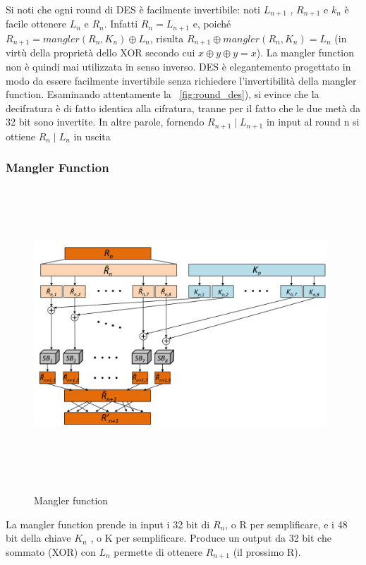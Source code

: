 Si noti che ogni round di DES è facilmente invertibile: noti $L_{n+1}$ , $R_{n+1}$ e $k_{n}$ è facile ottenere $L_{n}$ e $R_{n}$. Infatti $R_{n} = L_{n+1}$ e, poiché $R_{n+1} = mangler(R_{n}, K_{n}) \oplus L_{n}$, risulta $R_{n+1} \oplus mangler(R_{n}, K_{n}) = L_{n}$ (in virtù della proprietà dello XOR secondo cui $x \oplus y \oplus y = x$). La mangler function non è quindi mai utilizzata in senso inverso. DES è elegantemento progettato in modo da essere facilmente invertibile senza richiedere l'invertibilità della mangler function. Esaminando attentamente la \figurename ~\ref{fig:round_des}), si evince che la decifratura è di fatto identica alla cifratura, tranne per il fatto che le due metà da 32 bit sono invertite. In altre parole, fornendo $R_{n+1} \mid L_{n+1}$ in input al round n si ottiene $R_{n} \mid L_{n}$ in uscita
\subsubsection{Mangler Function}
\begin{figure}[htbp]
	\centering%
	\subfigure%
	{\includegraphics[height=11cm, width=11cm, keepaspectratio]{Immagini/Capitolo2/mangler.png}}
	\caption{Mangler function \label{fig:mangler}} 	
\end{figure}
La mangler function prende in input i 32 bit di $R_{n}$, o R per semplificare, e i 48 bit della chiave $K_{n}$ , o K per semplificare. Produce un output da 32 bit che sommato (XOR) con $L_{n}$ permette di ottenere $R_{n+1}$ (il prossimo R).\newline
